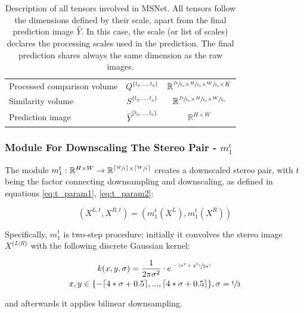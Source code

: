 \documentclass[runningheads]{llncs}
\begin{document}
\begin{table}[t]
\begin{tabular}{ l|c|c }
    Processed comparison volume & $Q^{ \{ t_0, ... , t_n \} }$ & $ \mathbb{R}^{ \sfrac{D}{t_0} \times \sfrac{H}{t_0} \times \sfrac{W}{t_0} \times K }  $ \rule{0pt}{3ex} \\
    
    Similarity volume & $S^{ \{ t_0, ... , t_n \} }$ & $ \mathbb{R}^{ \sfrac{D}{t_0} \times \sfrac{H}{t_0} \times \sfrac{W}{t_0}} $ \rule{0pt}{3.5ex} \\
    
    Prediction image & $\hat{Y}^{ \{ t_0, ... , t_n \} }$ & $\mathbb{R}^{ H \times W}$ \rule{0pt}{3.5ex} \\
    \hline
    \end{tabular}
    \caption{Description of all tensors involved in MSNet. All tensors follow the dimensions defined by their scale, apart from the final prediction image $\hat{Y}$. In this case, the scale (or list of scales) declares the processing scales used in the prediction. The final prediction shares always the same dimension as the raw images.}
    \label{tab:entity_description}
\end{table}
\subsubsection{Module For Downscaling The Stereo Pair - $m_1^t$}

The module $m_1^t: \mathbb{R}^{H \times W} \rightarrow \mathbb{R}^{\lceil \sfrac{H}{t} \rceil \times \lceil \sfrac{W}{t} \rceil }$ creates a downscaled stereo pair, with $t$ being the factor connecting downsampling and downscaling, as defined in equations \ref{eq:t_param1}, \ref{eq:t_param2}:

\begin{equation} \label{eq:g1}
    (X^{L,t}, X^{R,t}) = (m_1^t(X^L), m_1^t(X^R))
\end{equation}{}

Specifically, $m_1^t$ is two-step procedure; initially it convolves the stereo image $X^{\{L|R\}}$ with the following discrete Gaussian kernel:

\begin{gather} \label{eq:g1_kernel}
    k(x, y, \sigma) = \frac{1}{2\pi\sigma^2} \cdot e^{\sfrac{-(x^2 + y^2)}{2\sigma^2}} \\
    x,y \in \{-\lceil 4*\sigma + 0.5 \rceil, ..., \lceil 4*\sigma + 0.5 \rceil\}, \sigma = \sfrac{t}{3}
\end{gather}

and afterwards it applies bilinear downsampling.
\end{document}
